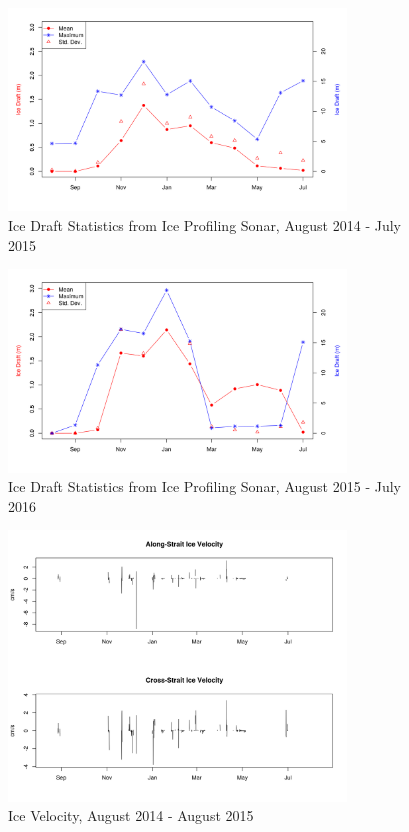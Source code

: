 \documentclass[12pt]{dforeport}
\begin{document}
\begin{figure}  
\centering
\includegraphics[width = 0.8\textwidth]{./figures/67_iceDraftStat_2014_2015.png}
\caption[Ice draft Statistics, 2014-2015]{Ice Draft Statistics from Ice Profiling Sonar, August 2014 - July 2015}
\label{f:ids_2014_2015}
\end{figure}

\begin{figure}  
\centering
\includegraphics[width = 0.8\textwidth]{./figures/68_iceDraftStat_2015_2016.png}
\caption[Ice draft Statistics, 2015-2016]{Ice Draft Statistics from Ice Profiling Sonar, August 2015 - July 2016}
\label{f:ids_2015_2016}
\end{figure}
  


\begin{figure}  
\centering
\includegraphics[width = 0.8\textwidth]{./figures/69_iceVel_2014_2015.png}
\caption[Ice Velocity, 2014-2015]{Ice Velocity, August 2014 - August 2015}
\label{f:ivel_2014_2015}
\end{figure}
\end{document}
